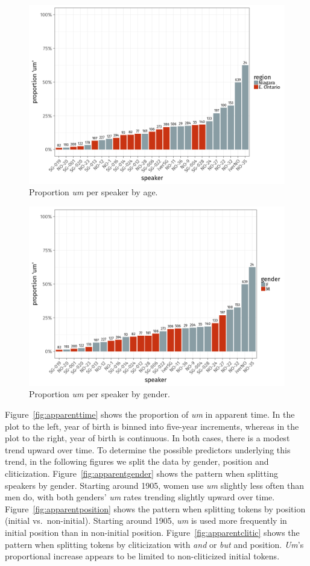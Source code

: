 \documentclass[11pt]{article}
\begin{document}

\begin{figure}[htpb]
    \centering
    \includegraphics[width=0.8\linewidth]{figures/indivage.png}
    \caption{Proportion \emph{um} per speaker by age.}
    \label{fig:indivage}
\end{figure}

\begin{figure}[htpb]
    \centering
    \includegraphics[width=0.8\linewidth]{figures/indivgender.png}
    \caption{Proportion \emph{um} per speaker by gender.}
    \label{fig:indivgender}
\end{figure}

Figure~\ref{fig:apparenttime} shows the proportion of \emph{um} in apparent
time.
In the plot to the left, year of birth is binned into five-year increments,
whereas in the plot to the right, year of birth is continuous.
In both cases, there is a modest trend upward over time.
To determine the possible predictors underlying this trend, in the following
figures we split the data by gender, position and cliticization.
Figure~\ref{fig:apparentgender} shows the pattern when splitting speakers by
gender.
Starting around 1905, women use \emph{um} slightly less often than men do, with
both genders' \emph{um} rates trending slightly upward over time.
Figure~\ref{fig:apparentposition} shows the pattern when splitting tokens by
position (initial vs.\ non-initial).
Starting around 1905, \emph{um} is used more frequently in initial position than
in non-initial position.
Figure~\ref{fig:apparentclitic} shows the pattern when splitting tokens by
cliticization with \emph{and} or \emph{but} and position.
\emph{Um}'s proportional increase appears to be limited to non-cliticized
initial tokens.
\end{document}
